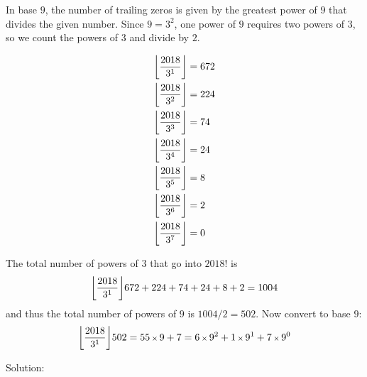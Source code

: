 In base $9$, the number of trailing zeros is given by the greatest power of $9$ that divides the given number. Since $9=3^{2}$, one power of $9$ requires two powers of $3$, so we count the powers of $3$ and divide by $2$.

\begin{align*}
\floor*{\frac{2018}{3^{1}}} 
& = 672
\\
\floor*{\frac{2018}{3^{2}}} 
& = 224
\\
\floor*{\frac{2018}{3^{3}}} 
& = 74
\\
\floor*{\frac{2018}{3^{4}}} 
& = 24
\\
\floor*{\frac{2018}{3^{5}}} 
& = 8
\\
\floor*{\frac{2018}{3^{6}}} 
& = 2
\\
\floor*{\frac{2018}{3^{7}}} 
& = 0
\end{align*}

The total number of powers of $3$ that go into $2018!$ is 
\begin{align*}
\floor*{\frac{2018}{3^{1}}} 
672 + 224 + 74 + 24 + 8 + 2 = 1004
\end{align*}
and thus the total number of powers of $9$ is $1004/2=502$. Now convert to base $9$: 
\begin{align*}
\floor*{\frac{2018}{3^{1}}} 
502 = 55 \mult 9 + 7
    = 6 \mult 9^2 + 1 \mult 9^1 + 7 \mult 9^0
\end{align*}

Solution: 
